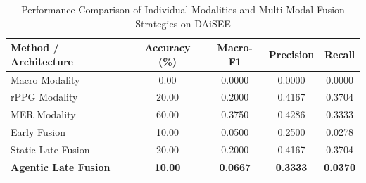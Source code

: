 \begin{table}[htbp]
\centering
\caption{Performance Comparison of Individual Modalities and Multi-Modal Fusion Strategies on DAiSEE}
\label{tab:engagement_results}
\begin{tabular}{lcccc}
\hline
\textbf{Method / Architecture} & \textbf{Accuracy (\%)} & \textbf{Macro-F1} & \textbf{Precision} & \textbf{Recall} \\
\hline
Macro Modality & 0.00 & 0.0000 & 0.0000 & 0.0000 \\
rPPG Modality & 20.00 & 0.2000 & 0.4167 & 0.3704 \\
MER Modality & 60.00 & 0.3750 & 0.4286 & 0.3333 \\
Early Fusion & 10.00 & 0.0500 & 0.2500 & 0.0278 \\
Static Late Fusion & 20.00 & 0.2000 & 0.4167 & 0.3704 \\
\textbf{Agentic Late Fusion} & \textbf{10.00} & \textbf{0.0667} & \textbf{0.3333} & \textbf{0.0370} \\
\hline
\end{tabular}
\end{table}
